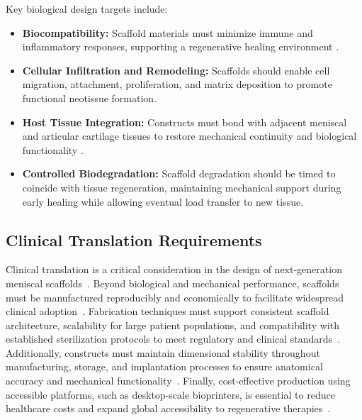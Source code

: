 Key biological design targets include:

\begin{itemize}
    \item \textbf{Biocompatibility:} Scaffold materials must minimize immune and inflammatory responses, supporting a regenerative healing environment \cite{beeler2020meniscussizing,li2024totalmeniscus}.
    
    \item \textbf{Cellular Infiltration and Remodeling:} Scaffolds should enable cell migration, attachment, proliferation, and matrix deposition to promote functional neotissue formation\cite{gupta2020meniscaltissue,du2023meniscusheterogeneity}.
    
    \item \textbf{Host Tissue Integration:} Constructs must bond with adjacent meniscal and articular cartilage tissues to restore mechanical continuity and biological functionality \cite{li2024totalmeniscus,mauck2000functionaltissue,lopez-calzada2016developmentmeniscus,yan2023meniscalfibrocartilage}.
    
    \item \textbf{Controlled Biodegradation:} Scaffold degradation should be timed to coincide with tissue regeneration, maintaining mechanical support during early healing while allowing eventual load transfer to new tissue\cite{wang20203dprinting,choi20213dprintedgelatin}.
\end{itemize}

\subsection{Clinical Translation Requirements}

Clinical translation is a critical consideration in the design of next-generation meniscal scaffolds~\cite{sun2017overviewscaffold}.
Beyond biological and mechanical performance, scaffolds must be manufactured reproducibly and economically to facilitate widespread clinical adoption~\cite{luis20203ddirect,vila2021bioengineeredoptogenetic, xiao2013mechanicaltesting}.
Fabrication techniques must support consistent scaffold architecture, scalability for large patient populations, and compatibility with established sterilization protocols to meet regulatory and clinical standards~\cite{gupta2020meniscaltissue}. Additionally, constructs must maintain dimensional stability throughout manufacturing, storage, and implantation processes to ensure anatomical accuracy and mechanical functionality~\cite{norberg2021viscoelasticequilibrium, woodruff2010returnforgotten}. Finally, cost-effective production using accessible platforms, such as desktop-scale bioprinters, is essential to reduce healthcare costs and expand global accessibility to regenerative therapies~\cite{sooriyaarachchi2019hybridfabrication, fares2018interpenetratingnetwork, gautam2013fabricationcharacterization, elkommos2025hybridhydrogels}.

